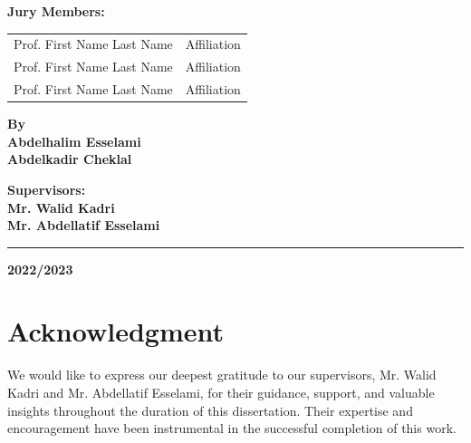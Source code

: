 \documentclass[12pt]{report}
\begin{document}
\begin{titlepage}
    \textbf{Jury Members:}\\[0.2cm]
	\begin{tabular}{ll}
		Prof. First Name Last Name & Affiliation \\
		Prof. First Name Last Name & Affiliation \\
		Prof. First Name Last Name & Affiliation \\
	\end{tabular}
    \begin{minipage}{0.5\textwidth}
        \vspace{3cm}
        \begin{flushleft}
        \textbf{\Large By}\\
        \textbf{\Large Abdelhalim Esselami}\\
        \textbf{\Large Abdelkadir Cheklal}
        \end{flushleft}
        \end{minipage}%
        \begin{minipage}{0.5\textwidth}
        \vspace{3cm}
        \begin{flushright}
        \textbf{\Large Supervisors:}\\
        \textbf{\Large Mr. Walid Kadri}\\
        \textbf{\Large Mr. Abdellatif Esselami}
        \end{flushright}
        \end{minipage}
    
    \vspace{1cm}
    
    \rule{\linewidth}{1pt} %
    
    \vfill
    
    \textbf{\Large 2022/2023}
    
    \end{titlepage}

        \vspace*{\fill}
        \section*{\centering Acknowledgment}

        We would like to express our deepest gratitude to our supervisors, Mr. Walid Kadri and Mr. Abdellatif Esselami, for their guidance, support, and valuable insights throughout the duration of this dissertation. Their expertise and encouragement have been instrumental in the successful completion of this work.
        
\end{document}
